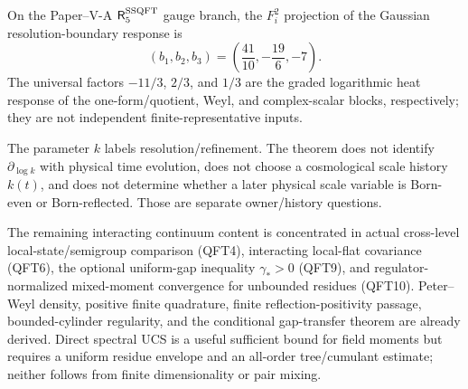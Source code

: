 \documentclass[12pt,a4paper]{article}
\begin{document}
\begin{corollary}
\label{p12:cor:v2140-sm-one-loop-boundary-response}
On the Paper--V-A \(\mathsf R_5^{\rm SSQFT}\) gauge branch, the
$F_i^2$ projection of the Gaussian resolution-boundary response is
\[
 \boxed{(b_1,b_2,b_3)=\left(\frac{41}{10},-\frac{19}{6},-7\right).}
\]
The universal factors $-11/3$, $2/3$, and $1/3$ are the graded logarithmic
heat response of the one-form/quotient, Weyl, and complex-scalar blocks,
respectively; they are not independent finite-representative inputs.
\end{corollary}

\begin{remark}
The parameter $k$ labels resolution/refinement.  The theorem does not identify
$\partial_{\log k}$ with physical time evolution, does not choose a
cosmological scale history $k(t)$, and does not determine whether a later
physical scale variable is Born-even or Born-reflected.  Those are separate
owner/history questions.
\end{remark}

\begin{remark}
The remaining interacting continuum content is concentrated in actual cross-level local-state/semigroup comparison (QFT4), interacting local-flat covariance (QFT6), the optional uniform-gap inequality \(\gamma_*>0\) (QFT9), and regulator-normalized mixed-moment convergence for unbounded residues (QFT10).  Peter--Weyl density, positive finite quadrature, finite reflection-positivity passage, bounded-cylinder regularity, and the conditional gap-transfer theorem are already derived.  Direct spectral UCS is a useful sufficient bound for field moments but requires a uniform residue envelope and an all-order tree/cumulant estimate; neither follows from finite dimensionality or pair mixing.
\end{remark}





\end{document}
